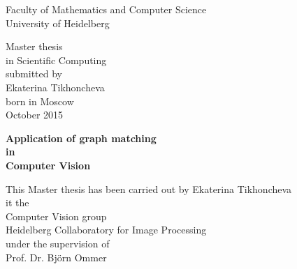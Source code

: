 \thispagestyle{empty}
\begin{center}
  \renewcommand{\baselinestretch}{2.00}
  \Large %
  Faculty of Mathematics and Computer Science\\
  \large University of Heidelberg
  \par\vfill\normalfont
  Master thesis\\
  in Scientific Computing\\
  submitted by\\
  Ekaterina Tikhoncheva\\
  born in Moscow\\
  October 2015
\end{center}
\newpage

\thispagestyle{empty}
\begin{center}
  \renewcommand{\baselinestretch}{2.00}
  \Large\bfseries %
    Application of graph matching\\
    in\\
    Computer Vision
  \par
  \vfill
  \large\normalfont
  This Master thesis has been carried out by Ekaterina Tikhoncheva\\
  it the\\
  Computer Vision group\\
  Heidelberg Collaboratory for Image Processing\\
  under the supervision of\\
  Prof. Dr. Björn Ommer
\end{center}\par
\vspace{5\baselineskip}

\onehalfspacing